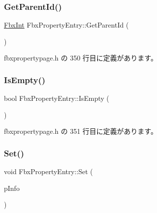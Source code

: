 \subsubsection{\texorpdfstring{Get\+Parent\+Id()}{GetParentId()}}
{\footnotesize\ttfamily \hyperlink{fbxtypes_8h_a088fa96de3b0b3ea69f0f6afef525dfb}{Fbx\+Int} Fbx\+Property\+Entry\+::\+Get\+Parent\+Id (\begin{DoxyParamCaption}{ }\end{DoxyParamCaption})\hspace{0.3cm}{\ttfamily [inline]}}



 fbxpropertypage.\+h の 350 行目に定義があります。

\mbox{\label{class_fbx_property_entry_a05ea4a2311ae76c4e74653dfbbca6446}} 
\subsubsection{\texorpdfstring{Is\+Empty()}{IsEmpty()}}
{\footnotesize\ttfamily bool Fbx\+Property\+Entry\+::\+Is\+Empty (\begin{DoxyParamCaption}{ }\end{DoxyParamCaption})\hspace{0.3cm}{\ttfamily [inline]}}



 fbxpropertypage.\+h の 351 行目に定義があります。

\mbox{\label{class_fbx_property_entry_ad1aae55932cd5bb6dac87c580ddf9e64}} 
\subsubsection{\texorpdfstring{Set()}{Set()}\hspace{0.1cm}{\footnotesize\ttfamily [1/5]}}
{\footnotesize\ttfamily void Fbx\+Property\+Entry\+::\+Set (\begin{DoxyParamCaption}\item[{\hyperlink{class_fbx_property_info}{Fbx\+Property\+Info} $\ast$}]{p\+Info }\end{DoxyParamCaption})\hspace{0.3cm}{\ttfamily [inline]}}



